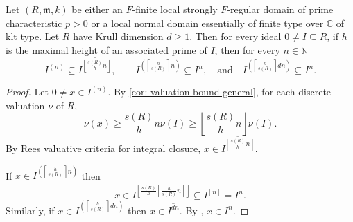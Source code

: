 \documentclass[12pt]{amsart}
\numberwithin{equation}{theorem}
\theoremstyle{plain}
\newcommand{\fm}{\mathfrak{m}}
\newcommand{\CC}{\mathbb{C}}
\newcommand{\NN}{\mathbb{N}}
\begin{document}
\begin{theorem}
    \label{cor: SFR rings enjoy USTP}
    Let $(R,\fm,k)$ be either an $F$-finite local strongly $F$-regular domain of prime characteristic $p>0$ or a local normal domain essentially of finite type over $\CC$ of klt type. Let $R$ have Krull dimension $d\geq 1$. Then for every ideal $0\not=I\subseteq R$, if $h$ is the maximal height of an associated prime of $I$, then for every $n\in\NN$
    \[
    I^{(n)}\subseteq \overline{I^{\left\lfloor \frac{s(R)}{h}n\right\rfloor}}, \quad\quad I^{\left(\left\lceil\frac{h}{s(R)}\right\rceil n\right)}\subseteq \overline{I^n}, \quad\mbox{and}\quad I^{\left(\left\lceil\frac{h}{s(R)}\right\rceil dn\right)}\subseteq I^n.
    \]
\end{theorem}

\begin{proof}
    Let $0\not=x\in I^{(n)}$. By \cref{cor: valuation bound general}, for each discrete valuation $\nu$ of $R$,
    \[
    \nu(x)\geq \frac{s(R)}{h}n\nu(I)\geq \left\lfloor\frac{s(R)}{h}n\right\rfloor \nu(I).
    \]
    By Rees valuative criteria for integral closure, $x\in \overline{I^{\left\lfloor \frac{s(R)}{h}n\right\rfloor }}$.

    If $x\in I^{\left(\left\lceil\frac{h}{s(R)}\right\rceil n\right)}$ then
    \[
    x\in \overline{I^{\left\lfloor\frac{s(R)}{h}\left\lceil\frac{h}{s(R)}n\right\rceil \right\rfloor}}\subseteq \overline{I^{\left\lfloor n\right\rfloor}} = \overline{I^n}.
    \]
    Similarly, if $x\in I^{\left(\left\lceil\frac{h}{s(R)}\right\rceil dn\right)}$ then $x\in \overline{I^{dn}}$. By \cite[Theorem 13.2.1 and Corollary 13.2.2]{HunekeSwanson2006}, $x\in I^n$.
\end{proof}
\end{document}
